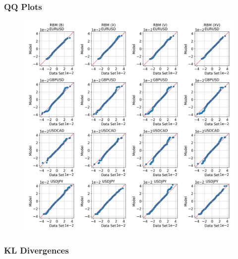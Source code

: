 \documentclass{beamer}
\begin{document}
\begin{frame}
    \frametitle{QQ Plots}
    \begin{figure}
        \includegraphics[width=0.65\linewidth]{rbm/qq.png}
    \end{figure}
\end{frame}

\begin{frame}
    \frametitle{KL Divergences}
    \begin{table}[!htb]
        \centering
        \begin{adjustbox}{max width=\textwidth}
            
        \end{adjustbox}
    \end{table}
\end{frame}

\end{document}
